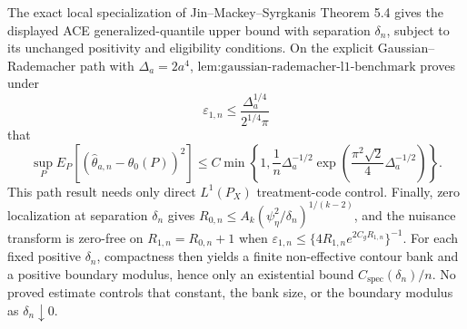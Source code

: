 The exact local specialization of Jin--Mackey--Syrgkanis Theorem 5.4 gives the displayed ACE generalized-quantile upper bound with separation \(\delta_n\), subject to its unchanged positivity and eligibility conditions.  On the explicit Gaussian--Rademacher path with \(\Delta_a=2a^4\), \(\text{lem:gaussian-rademacher-l1-benchmark}\) proves under
\[
 \varepsilon_{1,n}\le\frac{\Delta_a^{1/4}}{2^{1/4}\pi}
\]
that
\[
 \sup_P E_P[(\widehat\theta_{a,n}-\theta_0(P))^2]
 \le C\min\!\left\{1,\frac1n\Delta_a^{-1/2}
 \exp\!\left(\frac{\pi^2\sqrt2}{4}\Delta_a^{-1/2}\right)\right\}.
\]
This path result needs only direct \(L^1(P_X)\) treatment-code control.  Finally, zero localization at separation \(\delta_n\) gives \(R_{0,n}\le A_k(\psi_{\eta}^2/\delta_n)^{1/(k-2)}\), and the nuisance transform is zero-free on \(R_{1,n}=R_{0,n}+1\) when \(\varepsilon_{1,n}\le\{4R_{1,n}e^{2C_gR_{1,n}}\}^{-1}\).  For each fixed positive \(\delta_n\), compactness then yields a finite non-effective contour bank and a positive boundary modulus, hence only an existential bound \(C_{\mathrm{spec}}(\delta_n)/n\).  No proved estimate controls that constant, the bank size, or the boundary modulus as \(\delta_n\downarrow0\).